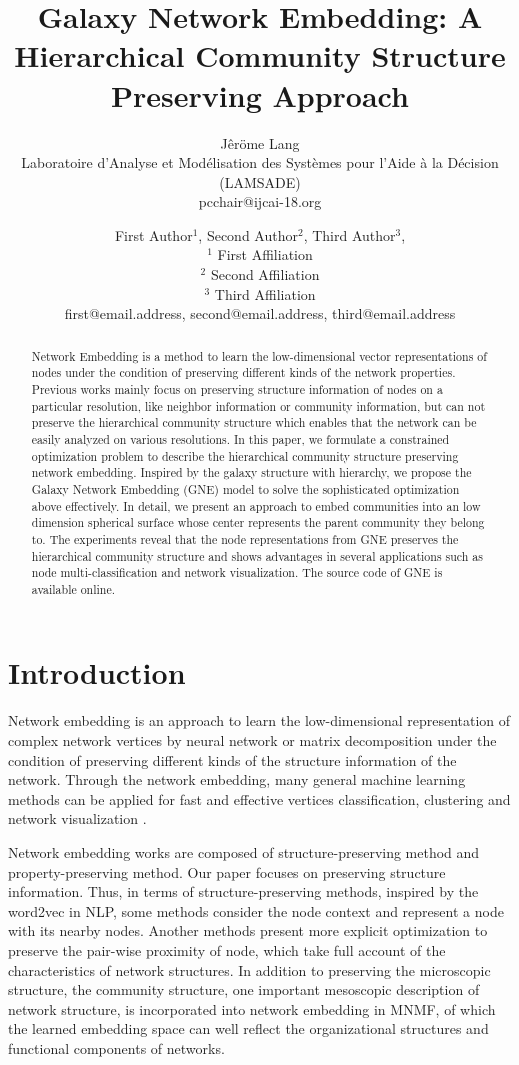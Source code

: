 \documentclass{article}
\title{Galaxy Network Embedding: A Hierarchical Community Structure Preserving Approach}
\author{Jêröme Lang\\ 
Laboratoire d'Analyse et Modélisation des Systèmes pour l'Aide à la Décision (LAMSADE)  \\
pcchair@ijcai-18.org}
\author{
First Author$^1$, 
Second Author$^2$, 
Third Author$^3$, 
\\ 
$^1$ First Affiliation \\
$^2$ Second Affiliation\\
$^3$ Third Affiliation  \\
%
first@email.address,
second@email.address,
third@email.address
}
\theoremstyle{definition}
\begin{document}
\maketitle

\begin{abstract}
	Network Embedding is a method to learn the low-dimensional vector representations of nodes under the condition of preserving different kinds of the network properties. Previous works mainly focus on preserving structure information of nodes on a particular resolution, like neighbor information or community information, but can not preserve the hierarchical community structure which enables that the network can be easily analyzed on various resolutions. In this paper, we formulate a constrained optimization problem to describe the hierarchical community structure preserving network embedding. Inspired by the galaxy structure with hierarchy, we propose the Galaxy Network Embedding (GNE) model to solve the sophisticated optimization above effectively. In detail, we present an approach to embed communities into an low dimension spherical surface whose center represents the parent community they belong to. The experiments reveal that the node representations from GNE preserves the hierarchical community structure and shows advantages in several applications such as node multi-classification and network visualization. The source code of GNE is available online.

\end{abstract}

\section{Introduction}

		Network embedding is an approach to learn the low-dimensional representation of complex network vertices by neural network \cite{Grover2016node2vec} or matrix decomposition \cite{Wang2017Community} under the condition of preserving different kinds of the structure information of the network. Through the network embedding, many general machine learning methods can be applied for fast and effective vertices classification, clustering and network visualization \cite{bhagat2011node} \cite{yan2007graph}.
		
		Network embedding works are composed of structure-preserving method and property-preserving method. Our paper focuses on preserving structure information. Thus, in terms of structure-preserving methods, inspired by the word2vec in NLP\cite{mikolov2013efficient}, some methods consider the node context and represent a node with its nearby nodes\cite{Perozzi2014DeepWalk}\cite{Grover2016node2vec}. Another methods present more explicit optimization to preserve the pair-wise proximity of node, which take full account of the characteristics of network structures\cite{Tang2015LINE}\cite{Cao2015GraRep}\cite{Wang2016Structural}. In addition to preserving the microscopic structure, the community structure, one important mesoscopic description of network structure, is incorporated into network embedding in MNMF, of which the learned embedding space can well reflect the organizational structures and functional components of networks\cite{Wang2017Community}.
\end{document}

